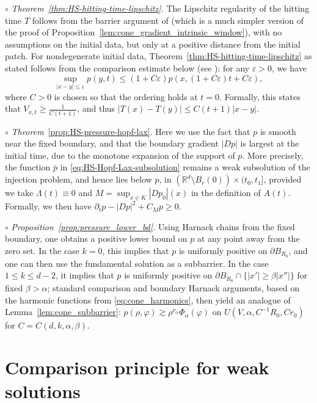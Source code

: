 \documentclass[11pt]{amsart}
\numberwithin{equation}{section}
\numberwithin{figure}{section}
\theoremstyle{plain}
\theoremstyle{definition}
\theoremstyle{remark}
\theoremstyle{plain}
\def\R{\mathbb{R}}
\def\e{\varepsilon}
\begin{document}
$\circ$ {\it Theorem~\ref{thm:HS-hitting-time-lipschitz}.} The Lipschitz regularity of the hitting time $T$ follows from the barrier argument of \cite{caffarelli1978} (which is a much simpler version of the proof of Proposition~\ref{lem:cone_gradient_intrinsic_window}), with no assumptions on the initial data, but only at a positive distance from the initial patch. For nondegenerate initial data, Theorem~\ref{thm:HS-hitting-time-lipschitz} as stated follows from the comparison estimate below (see \cite[proof of Theorem~3.1]{kim03}): for any $\e>0$, we have
$$
\sup_{|x-y|\leq \e } p(y,t) \leq (1+C\e)p(x,(1+C\e)t+C\e),
$$
where $C>0$ is chosen so that the ordering holds at $t=0$. Formally, this states that $V_{x,t} \geq \frac{1}{C (t+1)}$, and thus $|T(x)-T(y)|\leq C(t+1)|x-y|$.


$\circ$ {\it Theorem}~\ref{prop:HS-pressure-hopf-lax}. Here we use the fact that $p$ is smooth near the fixed boundary, and that the boundary gradient $|Dp|$ is largest at the initial time, due to the monotone expansion of the support of $p$. More precisely, the function $\bar{p}$ in \eqref{eq:HS-Hopf-Lax-subsolution} remains a weak subsolution of the injection problem, and hence lies below $p$, in $(\R^d\setminus B_r(0))\times(t_0,t_1]$, provided we take $\Lambda(t)\equiv 0$ and $M=\sup_{x\in K} |Dp_0|(x)$ in the definition of $A(t)$. Formally, we then have $\partial_t p - |Dp|^2 +C_M p \geq 0$.


$\circ$ {\it Proposition~\ref{prop:pressure_lower_bd}.}  Using Harnack chains from the fixed boundary, one obtains a positive lower bound on $p$ at any point away from the zero set. In the case $k=0$, this implies that $p$ is uniformly positive on $\partial B_{R_0}$, and one can then use the fundamental solution as a subbarrier. In the case $1 \leq k \leq d-2$, it implies that $p$ is uniformly positive on $\partial B_{R_0}\cap \{ |x'| \geq \beta |x''| \}$ for fixed $\beta > \alpha$; standard comparison and boundary Harnack arguments, based on the harmonic functions from \eqref{eq:cone_harmonics}, then yield an analogue of Lemma~\ref{lem:cone_subbarrier}: $p(\rho, \varphi) \gtrsim \rho^{\nu_\alpha}\Phi_\alpha(\varphi)$ on $U(V,\alpha, C^{-1}R_0,Cr_0)$ for $C=C(d,k,\alpha,\beta)$.

\appendix

\section{Comparison principle for weak solutions}\label{app:distributional-comparison}
\end{document}
